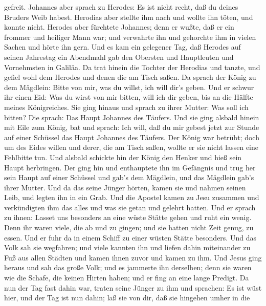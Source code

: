 gefreit.  Johannes aber sprach zu Herodes: Es ist nicht
recht, daß du deines Bruders Weib habest.  Herodias aber
stellte ihm nach und wollte ihn töten, und konnte nicht. 
Herodes aber fürchtete Johannes; denn er wußte, daß er ein frommer und
heiliger Mann war; und verwahrte ihn und gehorchte ihm in vielen Sachen
und hörte ihn gern.  Und es kam ein gelegener Tag, daß
Herodes auf seinen Jahrestag ein Abendmahl gab den Obersten und
Hauptleuten und Vornehmsten in Galiläa.  Da trat hinein die
Tochter der Herodias und tanzte, und gefiel wohl dem Herodes und denen
die am Tisch saßen. Da sprach der König zu dem Mägdlein: Bitte von mir,
was du willst, ich will dir's geben.  Und er schwur ihr
einen Eid: Was du wirst von mir bitten, will ich dir geben, bis an die
Hälfte meines Königreiches.  Sie ging hinaus und sprach zu
ihrer Mutter: Was soll ich bitten? Die sprach: Das Haupt Johannes des
Täufers.  Und sie ging alsbald hinein mit Eile zum König,
bat und sprach: Ich will, daß du mir gebest jetzt zur Stunde auf einer
Schüssel das Haupt Johannes des Täufers.  Der König war
betrübt; doch um des Eides willen und derer, die am Tisch saßen, wollte
er sie nicht lassen eine Fehlbitte tun.  Und alsbald
schickte hin der König den Henker und hieß sein Haupt herbringen. Der
ging hin und enthauptete ihn im Gefängnis  und trug her
sein Haupt auf einer Schüssel und gab's dem Mägdlein, und das Mägdlein
gab's ihrer Mutter.  Und da das seine Jünger hörten, kamen
sie und nahmen seinen Leib, und legten ihn in ein Grab. 
Und die Apostel kamen zu Jesu zusammen und verkündigten ihm das alles
und was sie getan und gelehrt hatten.  Und er sprach zu
ihnen: Lasset uns besonders an eine wüste Stätte gehen und ruht ein
wenig. Denn ihr waren viele, die ab und zu gingen; und sie hatten nicht
Zeit genug, zu essen.  Und er fuhr da in einem Schiff zu
einer wüsten Stätte besonders.  Und das Volk sah sie
wegfahren; und viele kannten ihn und liefen dahin miteinander zu Fuß aus
allen Städten und kamen ihnen zuvor und kamen zu ihm.  Und
Jesus ging heraus und sah das große Volk; und es jammerte ihn derselben;
denn sie waren wie die Schafe, die keinen Hirten haben; und er fing an
eine lange Predigt.  Da nun der Tag fast dahin war, traten
seine Jünger zu ihm und sprachen: Es ist wüst hier, und der Tag ist nun
dahin;  laß sie von dir, daß sie hingehen umher in die
